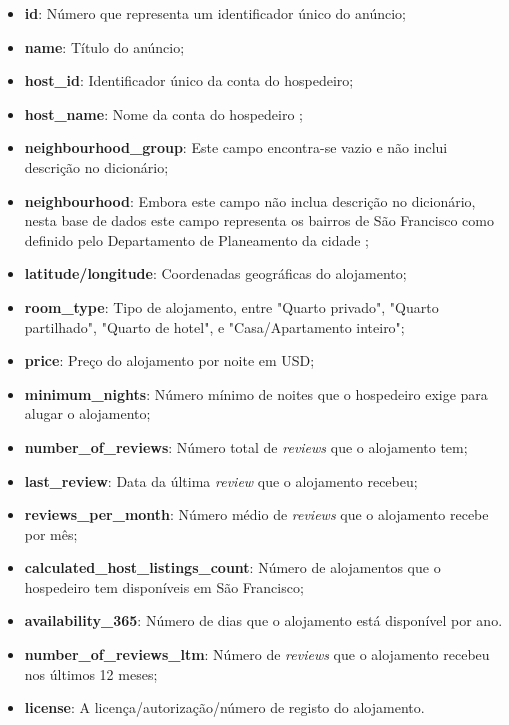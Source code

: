 \documentclass[a4paper, justified]{tufte-handout}\usepackage[]{graphicx}\usepackage[]{xcolor}
\begin{document}
\begin{itemize}
  \item \textbf{id}: Número que representa um identificador único do anúncio;
  \item \textbf{name}: Título do anúncio;
  \item \textbf{host\_id}: Identificador único da conta do hospedeiro;
  \item \textbf{host\_name}: Nome da conta do hospedeiro ;
  \item \textbf{neighbourhood\_group}: Este campo encontra-se vazio e não inclui descrição no dicionário;
  \item \textbf{neighbourhood}: Embora este campo não inclua descrição no dicionário, nesta base de dados este campo representa os bairros de São Francisco como definido pelo Departamento de Planeamento da cidade ;
  \item \textbf{latitude/longitude}: Coordenadas geográficas do alojamento;
  \item \textbf{room\_type}: Tipo de alojamento, entre "Quarto privado", "Quarto partilhado", "Quarto de hotel", e "Casa/Apartamento inteiro";
  \item \textbf{price}: Preço do alojamento por noite em USD;
  \item \textbf{minimum\_nights}: Número mínimo de noites que o hospedeiro exige para alugar o alojamento;
  \item \textbf{number\_of\_reviews}: Número total de \textit{reviews} que o alojamento tem;
  \item \textbf{last\_review}: Data da última \textit{review} que o alojamento recebeu;
  \item \textbf{reviews\_per\_month}: Número médio de \textit{reviews} que o alojamento recebe por mês;
  \item \textbf{calculated\_host\_listings\_count}: Número de alojamentos que o hospedeiro tem disponíveis em São Francisco;
  \item \textbf{availability\_365}: Número de dias que o alojamento está disponível por ano.
  \item \textbf{number\_of\_reviews\_ltm}: Número de \textit{reviews} que o alojamento recebeu nos últimos 12 meses;
  \item \textbf{license}: A licença/autorização/número de registo do alojamento.
\end{itemize}
\end{document}
